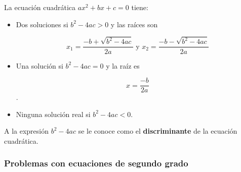 \documentclass[11pt]{book}
\begin{document}
\begin{enumerate}
        \begin{boxH}
          La ecuación cuadrática $ax^2 + bx + c = 0$ tiene:
          \begin{itemize}
            \item Dos soluciones si $b^2 - 4ac > 0$ y las raíces son

                  \[x_1 = \frac{-b + \sqrt{b^2 - 4ac}}{2a} \text{ y } x_2 = \frac{-b - \sqrt{b^2 - 4ac}}{2a}\]

            \item Una solución si $b^2 - 4ac = 0$ y la raíz es

                  \[x = \frac{-b}{2a}\].

            \item Ninguna solución real si $b^2 - 4ac < 0$.
          \end{itemize}

        \end{boxH}

        \begin{boxH}
          A la expresión \textbf{$b^2 - 4ac$} se le conoce como el \textbf{discriminante} de la ecuación
          cuadrática.
        \end{boxH}
\end{enumerate}

\newpage

\subsubsection{Problemas con ecuaciones de segundo grado}
\end{document}
